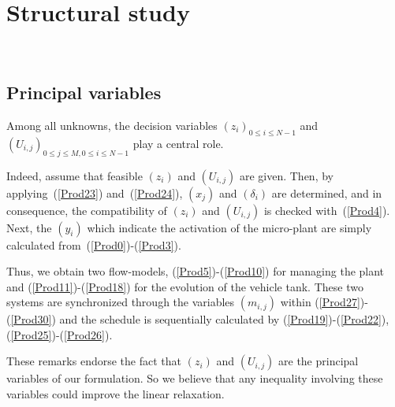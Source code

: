 \documentclass[11pt]{article}
\theoremstyle{plain}%
\theoremstyle{definition} \newtheorem{lem}{Lemma}[section]
\theoremstyle{definition} \newtheorem{claim}{Claim}[lem]
\theoremstyle{definition} \newtheorem{theorem}{Theorem}[section]
\theoremstyle{definition} \newtheorem{exo}{Exercice n$^\circ$}
\theoremstyle{definition} \newtheorem{quest}{}[exo]
\theoremstyle{definition} \newtheorem{sousquest}{}[quest]
\theoremstyle{remark}
\theoremstyle{definition}
\begin{document}

%
\section{Structural study}~\label{sec5}
%
\subsection{Principal variables}
%
Among all unknowns, the decision variables $(z_i)_{0 \leq i \leq N-1}$ and $(U_{i, j})_{0 \leq j \leq M, 0 \leq i \leq N-1 }$
play a central role.

Indeed, assume that feasible $(z_i)$ and $(U_{i, j})$ are given. Then, by applying~(\ref{Prod23}) and~(\ref{Prod24}),
$(x_j)$ and $(\delta_i)$ are determined, and in consequence, the compatibility of  $(z_i)$ and $(U_{i, j})$
is checked with~(\ref{Prod4}). Next, the $(y_i)$ which indicate the activation of the micro-plant are simply calculated
from~(\ref{Prod0})-(\ref{Prod3}). 

Thus, we obtain two flow-models, (\ref{Prod5})-(\ref{Prod10}) for managing the plant and
(\ref{Prod11})-(\ref{Prod18}) for the evolution of the vehicle tank. These two systems
are synchronized through the variables $(m_{i, j})$ within (\ref{Prod27})-(\ref{Prod30}) and
the schedule is sequentially calculated by (\ref{Prod19})-(\ref{Prod22}), (\ref{Prod25})-(\ref{Prod26}).

These remarks endorse the fact that $(z_i)$ and $(U_{i, j})$ are the principal variables
of our formulation. So we believe that any inequality involving these variables 
could improve the linear relaxation.


\end{document}
